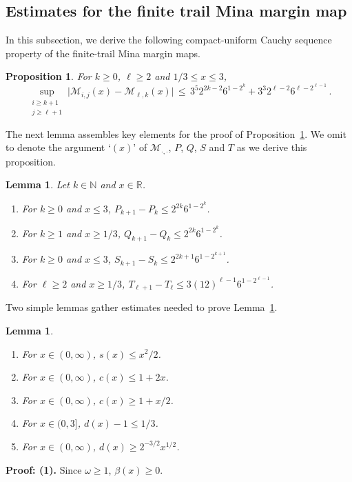 \documentclass[letterpaper,11pt,oneside,reqno]{amsbook}
\newcommand{\N}{\ensuremath{\mathbb{N}}}
\newcommand{\R}{\ensuremath{\mathbb{R}}}
\numberwithin{figure}{chapter}
\newtheorem{lemma}[theorem]{Lemma}
\newtheorem{proposition}[theorem]{Proposition}
\theoremstyle{definition}
\theoremstyle{definition}
\theoremstyle{definition}
\theoremstyle{definition}
\theoremstyle{definition}
\newcommand{\mc}{\mathcal}
\newcommand{\nwithzero}{\N}
\newcommand{\macsee}{c}
\newcommand{\macbeta}{\beta}
\newcommand{\macomega}{\omega}
\newcommand{\macdee}{d}
\newcommand{\minamm}{\mathcal{M}}
\begin{document}
\subsection{Estimates for the finite trail Mina margin map}
In this subsection, we derive the following compact-uniform Cauchy sequence property of the finite-trail Mina margin maps.
\begin{proposition}\label{p.rkrell}
For $k \geq 0$, $\ell \geq 2$ and $1/3 \leq x \leq 3$,
$$
 \sup_{\substack{i \geq k+1 \\ j \geq \ell +1}} 
  \big\vert \minamm_{i,j}(x) - \minamm_{\ell,k}(x) \big\vert \, \leq \,  3^5 2^{2k-2} 6^{1-2^k} + 3^3 2^{\ell-2}  6^{\ell -2^{\ell-1}} 
\, .
$$
\end{proposition}
The next lemma assembles key elements for the proof of Proposition~\ref{p.rkrell}. We omit to denote the argument `$(x)$'
of $\mc{M}_{\cdot,\cdot}$, $P$, $Q$, $S$ and $T$ as we derive this proposition.
\begin{lemma}\label{l.pqst}
Let $k \in \nwithzero$ and $x \in \R$.
\begin{enumerate}
\item For $k \geq 0$ and $x \leq 3$, $P_{k+1} - P_k \leq 2^{2k} 6^{1-2^k}$.
\item For $k \geq 1$ and $x \geq 1/3$, $Q_{k+1} - Q_k \leq 2^{2k} 6^{1-2^k}$.
\item For $k \geq 0$ and $x \leq 3$, $S_{k+1} - S_k \leq 2^{2k+1} 6^{1-2^{k+1}}$.
\item For $\ell \geq 2$ and $x \geq 1/3$, $T_{\ell+1} - T_\ell \leq 3 (12)^{\ell-1}  6^{1-2^{\ell-1}}$.
\end{enumerate}
\end{lemma}
Two simple lemmas gather estimates needed to prove Lemma~\ref{l.pqst}.
\begin{lemma}\label{l.abounds}
\leavevmode
\begin{enumerate}
 \item For $x \in (0,\infty)$, $s(x) \leq x^2/2$.
 \item For $x \in (0,\infty)$,  $\macsee(x) \leq 1 +  2x$. 
\item  For $x \in (0,\infty)$,  $\macsee(x) \geq 1+x/2$.
 \item For $x \in (0,3]$, $\macdee(x) - 1 \leq 1/3$. 
 \item For $x \in (0,\infty)$, $\macdee(x) \geq 2^{-3/2} x^{1/2}$. \end{enumerate}
 \end{lemma}
{\bf Proof: (1).} Since $\macomega \geq 1$, $\macbeta(x) \geq 0$.
\end{document}
